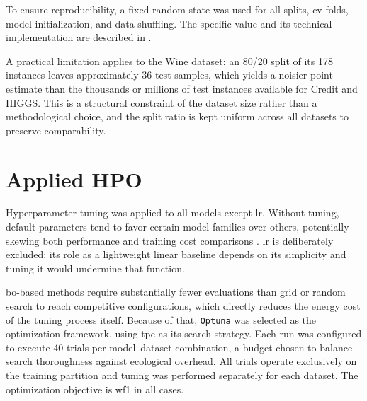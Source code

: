 To ensure reproducibility, a fixed random state was used for all splits, \gls{cv} folds, model initialization, and data shuffling. The specific value and its technical implementation are described in .

A practical limitation applies to the Wine dataset: an 80/20 split of its 178 instances leaves approximately 36 test samples, which yields a noisier point estimate than the thousands or millions of test instances available for Credit and HIGGS. This is a structural constraint of the dataset size rather than a methodological choice, and the split ratio is kept uniform across all datasets to preserve comparability.

\section{Applied HPO}
\label{design_hyperparameter}
Hyperparameter tuning was applied to all models except \gls{lr}. Without tuning, default parameters tend to favor certain model families over others, potentially skewing both performance and training cost comparisons \cite{bagnallUseDefaultParameter2017}. \gls{lr} is deliberately excluded: its role as a lightweight linear baseline depends on its simplicity and tuning it would undermine that function.

\gls{bo}-based methods require substantially fewer evaluations than grid or random search to reach competitive configurations, which directly reduces the energy cost of the tuning process itself. Because of that, \texttt{Optuna} was selected as the optimization framework, using \gls{tpe} as its search strategy. Each run was configured to execute 40 trials per model--dataset combination, a budget chosen to balance search thoroughness against ecological overhead. All trials operate exclusively on the training partition and tuning was performed separately for each dataset. The optimization objective is \gls{wf1} in all cases.

